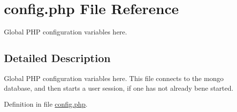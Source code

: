 \hypertarget{config_8php}{\section{config.\-php \-File \-Reference}
\label{config_8php}
}


\-Global \-P\-H\-P configuration variables here.  




\subsection{\-Detailed \-Description}
\-Global \-P\-H\-P configuration variables here. \-This file connects to the mongo database, and then starts a user session, if one has not already bene started. 

\-Definition in file \hyperlink{config_8php_source}{config.\-php}.

